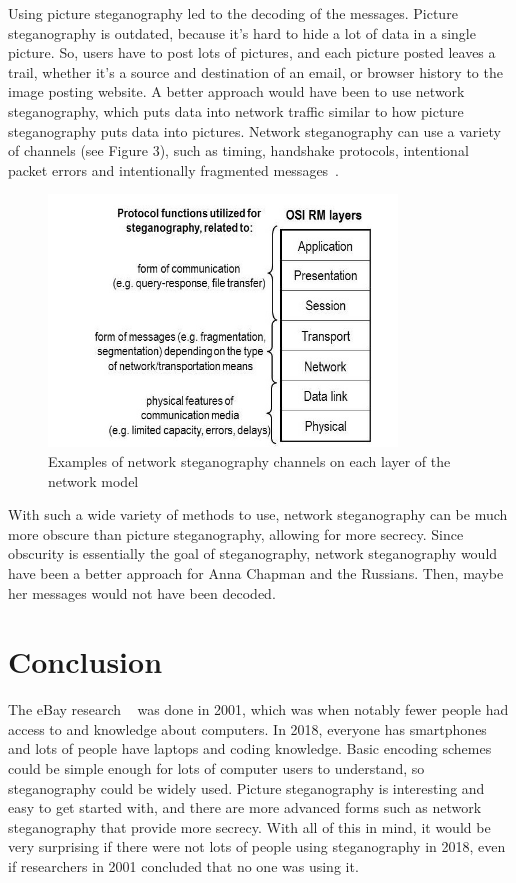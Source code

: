 	Using picture steganography led to the decoding of the messages. Picture steganography is outdated, because it's hard to hide a lot of data in a single picture. So, users have to post lots of pictures, and each picture posted leaves a trail, whether it's a source and destination of an email, or browser history to the image posting website. A better approach would have been to use network steganography, which puts data into network traffic similar to how picture steganography puts data into pictures. Network steganography can use a variety of channels (see Figure 3), such as timing, handshake protocols, intentional packet errors and intentionally fragmented messages~\cite{net}. 
\begin{figure}[h]
\caption{Examples of network steganography channels on each layer of the network model ~\cite{net}}
\centering
\includegraphics[scale=2.3]{fig3}
\end{figure}
	With such a wide variety of methods to use, network steganography can be much more obscure than picture steganography, allowing for more secrecy. Since obscurity is essentially the goal of steganography, network steganography would have been a better approach for Anna Chapman and the Russians. Then, maybe her messages would not have been decoded.


\section{Conclusion}
	The eBay research ~\cite{provos} was done in 2001, which was when notably fewer people had access to and knowledge about computers. In 2018, everyone has smartphones and lots of people have laptops and coding knowledge. Basic encoding schemes could be simple enough for lots of computer users to understand, so steganography could be widely used. Picture steganography is interesting and easy to get started with, and there are more advanced forms such as network steganography that provide more secrecy. With all of this in mind, it would be very surprising if there were not lots of people using steganography in 2018, even if researchers in 2001 concluded that no one was using it.

